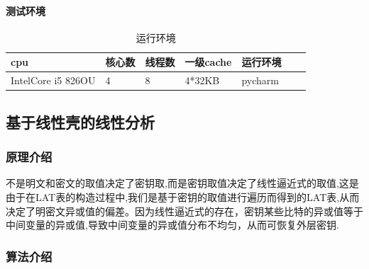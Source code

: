 \documentclass[UTF-8]{ctexart}
\begin{document}
\paragraph{测试环境}
\begin{table}  [htbp]
	\caption{运行环境}  
	\begin{center}  
		\begin{tabular}{|l|l|l|l|l|l|l|} 
			\hline
			cpu   & 核心数 & 线程数 & 一级cache & 运行环境  \\ \hline
			IntelCore i5 826OU & 4     & 8     & 4*32KB & pycharm  \\ \hline				
		\end{tabular}  
	\end{center}  
\end{table}

\subsection{基于线性壳的线性分析}
\subsubsection{原理介绍}
不是明文和密文的取值决定了密钥取,而是密钥取值决定了线性逼近式的取值,这是由于在LAT表的构造过程中,我们是基于密钥的取值进行遍历而得到的LAT表,从而决定了明密文异或值的偏差。因为线性逼近式的存在，密钥某些比特的异或值等于中间变量的异或值,导致中间变量的异或值分布不均匀，从而可恢复外层密钥.
\subsubsection{算法介绍}
\end{document}
